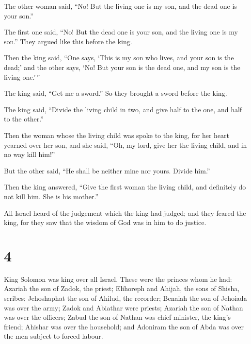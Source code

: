  The other woman said, ``No! But the living one is my son,
and the dead one is your son.''

The first one said, ``No! But the dead one is your son, and the living
one is my son.'' They argued like this before the king.

 Then the king said, ``One says, `This is my son who lives,
and your son is the dead;' and the other says, `No! But your son is the
dead one, and my son is the living one.'\,''

 The king said, ``Get me a sword.'' So they brought a sword
before the king.

 The king said, ``Divide the living child in two, and give
half to the one, and half to the other.''

 Then the woman whose the living child was spoke to the
king, for her heart yearned over her son, and she said, ``Oh, my lord,
give her the living child, and in no way kill him!''

But the other said, ``He shall be neither mine nor yours. Divide him.''

 Then the king answered, ``Give the first woman the living
child, and definitely do not kill him. She is his mother.''

 All Israel heard of the judgement which the king had
judged; and they feared the king, for they saw that the wisdom of God
was in him to do justice.

\hypertarget{section-3}{%
\section{4}\label{section-3}}

 King Solomon was king over all Israel.  These
were the princes whom he had: Azariah the son of Zadok, the priest;
 Elihoreph and Ahijah, the sons of Shisha, scribes;
Jehoshaphat the son of Ahilud, the recorder;  Benaiah the
son of Jehoiada was over the army; Zadok and Abiathar were priests;
 Azariah the son of Nathan was over the officers; Zabud the
son of Nathan was chief minister, the king's friend; 
Ahishar was over the household; and Adoniram the son of Abda was over
the men subject to forced labour.

